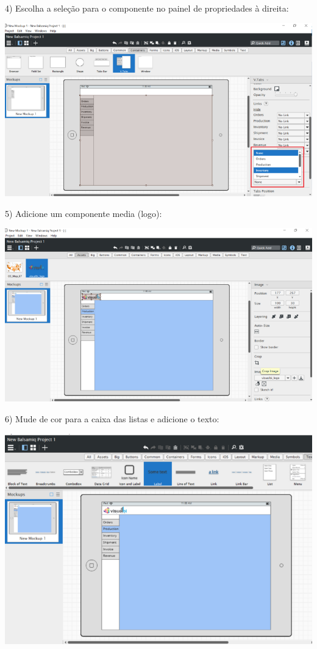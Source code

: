 \documentclass{tufte-book} %
\begin{document}
\break

4) Escolha a seleção para o componente no painel de propriedades à direita:

\begin{center}
	\includegraphics{img14.png}
\end{center}

5) Adicione um componente media (logo):

\begin{center}
	\includegraphics{img15.png}
\end{center}

6) Mude de cor para a caixa das listas e adicione o texto:

\begin{center}
	\includegraphics{img16.png}
\end{center}
\end{document}

